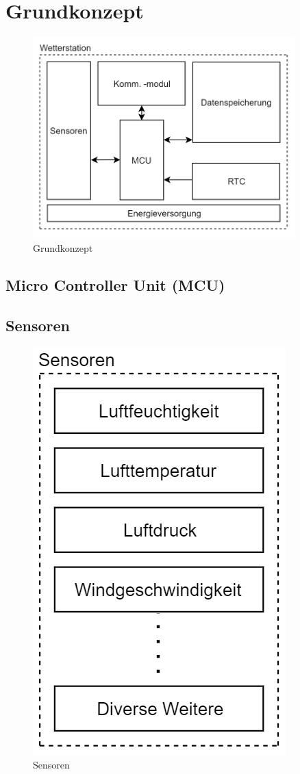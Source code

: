 \section{Grundkonzept}
\begin{figure}[h]
\centering
\includegraphics[width=0.9\textwidth]{graphics/Grundkonzept.PNG}
\caption{Grundkonzept}
\end{figure}
\newpage
\subsection{Micro Controller Unit (MCU)}

\newpage
\subsection{Sensoren}
\begin{figure}[h]
\centering
\includegraphics[scale=0.8]{graphics/Sensoren.PNG}
\caption{Sensoren}
\end{figure}

